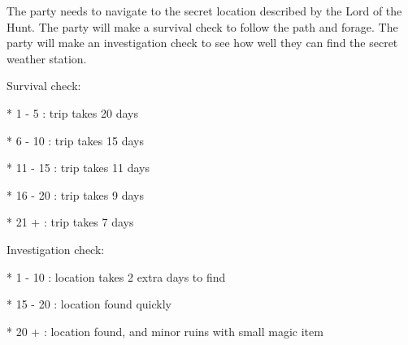 The party needs to navigate to the secret location described by the Lord of the Hunt.
The party will make a survival check to follow the path and forage.
The party will make an investigation check to see how well they can find the secret weather station.

Survival check:

* 1 - 5   : trip takes 20 days

* 6 - 10  : trip takes 15 days

* 11 - 15 : trip takes 11 days

* 16 - 20 : trip takes 9 days

* 21 +    : trip takes 7 days


Investigation check:

* 1 - 10  : location takes 2 extra days to find

* 15 - 20 : location found quickly

* 20 +    : location found, and minor ruins with small magic item
